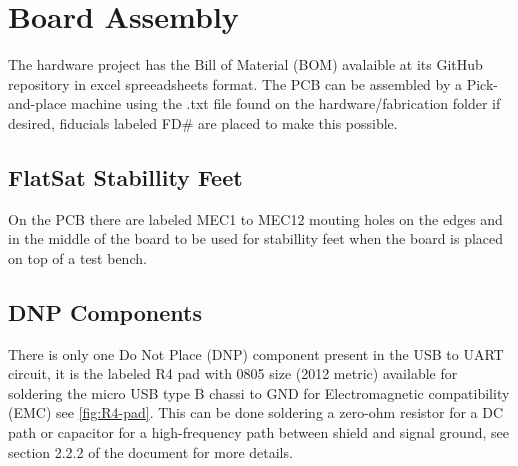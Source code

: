 %
%
%
%
%

%
%
%
%
%
%

\chapter{Board Assembly}

The hardware project has the Bill of Material (BOM) avalaible at its GitHub repository in excel spreeadsheets format. The PCB can be assembled by a Pick-and-place machine using the .txt file found on the hardware/fabrication folder if desired, fiducials labeled FD\# are placed to make this possible.

\section{FlatSat Stabillity Feet}

On the PCB there are labeled MEC1 to MEC12 mouting holes on the edges and in the middle of the board to be used for stabillity feet when the board is placed on top of a test bench.

\section{DNP Components}

There is only one Do Not Place (DNP) component present in the USB to UART circuit, it is the labeled R4 pad with 0805 size (2012 metric) available for soldering the micro USB type B chassi to GND for Electromagnetic compatibility (EMC) see \ref{fig:R4-pad}. This can be done soldering a zero-ohm resistor for a DC path or capacitor for a high-frequency path between shield and signal ground, see section 2.2.2 of the document \cite{ftdi-usb-hardware-guidelines} for more details.


